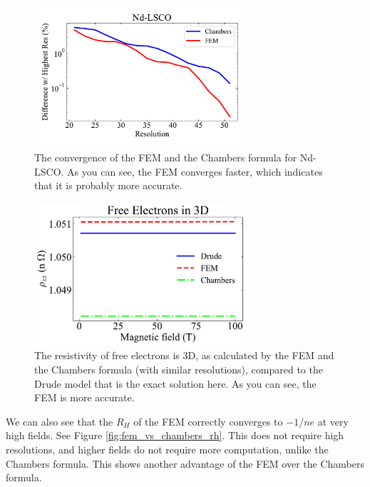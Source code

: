 \documentclass[12pt]{article}
\begin{document}
\begin{figure}
    \centering
    \includegraphics[width=0.7\textwidth]{figures/fem_vs_chambers_convergence}
    \caption{The convergence of the FEM and the Chambers formula for Nd-LSCO. As you can see,
        the FEM converges faster, which indicates that it is probably more accurate.}
    \label{fig:fem_vs_chambers_convergence}
\end{figure}
\begin{figure}%
    \centering
    \includegraphics[width=0.7\textwidth]{figures/free_electrons_resistivity}
    \caption{The resistivity of free electrons is 3D, as calculated by the FEM and the
        Chambers formula (with similar resolutions), compared to the Drude model that is the
        exact solution here. As you can see, the FEM is more accurate.}
    \label{fig:free_electrons_resistivity}
\end{figure}

We can also see that the $R_H$ of the FEM correctly converges to $-1/ne$ at very high fields.
See Figure \ref{fig:fem_vs_chambers_rh}. This does not require high resolutions, and higher
fields do not require more computation, unlike the Chambers formula. This shows another
advantage of the FEM over the Chambers formula.
\end{document}
